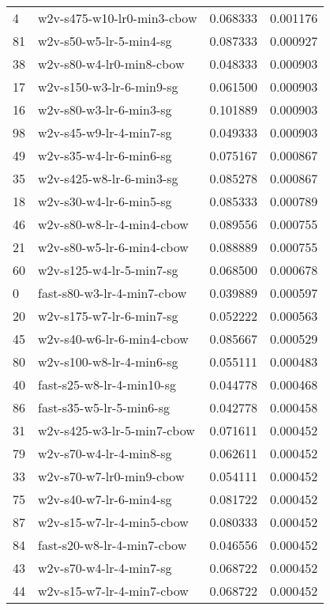 {\begin{tabular}{llrr}
4  &    w2v-s475-w10-lr0-min3-cbow &  0.068333 &  0.001176 \\
81 &       w2v-s50-w5-lr-5-min4-sg &  0.087333 &  0.000927 \\
38 &      w2v-s80-w4-lr0-min8-cbow &  0.048333 &  0.000903 \\
17 &      w2v-s150-w3-lr-6-min9-sg &  0.061500 &  0.000903 \\
16 &       w2v-s80-w3-lr-6-min3-sg &  0.101889 &  0.000903 \\
98 &       w2v-s45-w9-lr-4-min7-sg &  0.049333 &  0.000903 \\
49 &       w2v-s35-w4-lr-6-min6-sg &  0.075167 &  0.000867 \\
35 &      w2v-s425-w8-lr-6-min3-sg &  0.085278 &  0.000867 \\
18 &       w2v-s30-w4-lr-6-min5-sg &  0.085333 &  0.000789 \\
46 &     w2v-s80-w8-lr-4-min4-cbow &  0.089556 &  0.000755 \\
21 &     w2v-s80-w5-lr-6-min4-cbow &  0.088889 &  0.000755 \\
60 &      w2v-s125-w4-lr-5-min7-sg &  0.068500 &  0.000678 \\
0  &    fast-s80-w3-lr-4-min7-cbow &  0.039889 &  0.000597 \\
20 &      w2v-s175-w7-lr-6-min7-sg &  0.052222 &  0.000563 \\
45 &     w2v-s40-w6-lr-6-min4-cbow &  0.085667 &  0.000529 \\
80 &      w2v-s100-w8-lr-4-min6-sg &  0.055111 &  0.000483 \\
40 &     fast-s25-w8-lr-4-min10-sg &  0.044778 &  0.000468 \\
86 &      fast-s35-w5-lr-5-min6-sg &  0.042778 &  0.000458 \\
31 &    w2v-s425-w3-lr-5-min7-cbow &  0.071611 &  0.000452 \\
79 &       w2v-s70-w4-lr-4-min8-sg &  0.062611 &  0.000452 \\
33 &      w2v-s70-w7-lr0-min9-cbow &  0.054111 &  0.000452 \\
75 &       w2v-s40-w7-lr-6-min4-sg &  0.081722 &  0.000452 \\
87 &     w2v-s15-w7-lr-4-min5-cbow &  0.080333 &  0.000452 \\
84 &    fast-s20-w8-lr-4-min7-cbow &  0.046556 &  0.000452 \\
43 &       w2v-s70-w4-lr-4-min7-sg &  0.068722 &  0.000452 \\
44 &     w2v-s15-w7-lr-4-min7-cbow &  0.068722 &  0.000452 \\

\end{tabular}}
